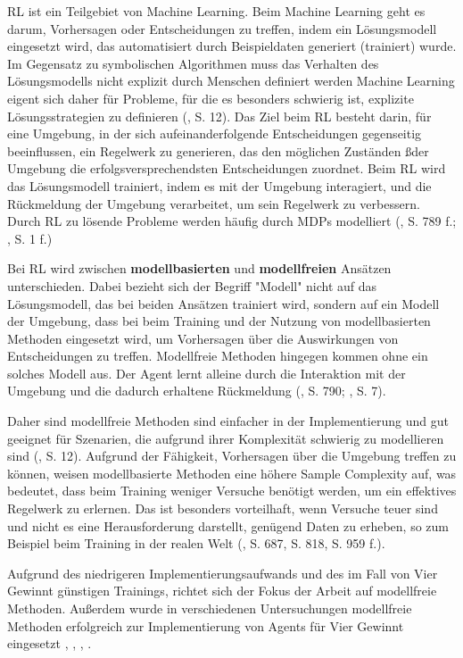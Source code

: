 RL ist ein Teilgebiet von Machine Learning. Beim Machine Learning geht es darum, Vorhersagen oder Entscheidungen zu treffen, indem ein Lösungsmodell eingesetzt wird, das automatisiert durch Beispieldaten generiert (trainiert) wurde. Im Gegensatz zu symbolischen Algorithmen muss das Verhalten des Lösungsmodells nicht explizit durch Menschen definiert werden Machine Learning eigent sich daher für Probleme, für die es besonders schwierig ist, explizite Lösungsstrategien zu definieren (\cite{Humm.2020}, S. 12). Das Ziel beim RL besteht darin, für eine Umgebung, in der sich aufeinanderfolgende Entscheidungen gegenseitig beeinflussen, ein Regelwerk zu generieren, das den möglichen Zuständen ßder Umgebung die erfolgsversprechendsten Entscheidungen zuordnet. Beim RL wird das Lösungsmodell trainiert, indem es mit der Umgebung interagiert, und die Rückmeldung der Umgebung verarbeitet, um sein Regelwerk zu verbessern. Durch RL zu lösende Probleme werden häufig durch MDPs modelliert (\cite{Russell.2020}, S. 789 f.; \cite{Sutton.2018}, S. 1 f.)


Bei RL wird zwischen \textbf{modellbasierten} und \textbf{modellfreien} Ansätzen unterschieden. Dabei bezieht sich der Begriff "Modell" nicht auf das Lösungsmodell, das bei beiden Ansätzen trainiert wird, sondern auf ein Modell der Umgebung, dass bei beim Training und der Nutzung von modellbasierten Methoden eingesetzt wird, um Vorhersagen über die Auswirkungen von Entscheidungen zu treffen. Modellfreie Methoden hingegen kommen ohne ein solches Modell aus. Der Agent lernt alleine durch die Interaktion mit der Umgebung und die dadurch erhaltene Rückmeldung (\cite{Russell.2020}, S. 790; \cite{Sutton.2018}, S. 7).

Daher sind modellfreie Methoden sind einfacher in der Implementierung und gut geeignet für Szenarien, die aufgrund ihrer Komplexität schwierig zu modellieren sind (\cite{Sutton.2018}, S. 12). Aufgrund der Fähigkeit, Vorhersagen über die Umgebung treffen zu können, weisen modellbasierte Methoden eine höhere Sample Complexity auf, was bedeutet, dass beim Training weniger Versuche benötigt werden, um ein effektives Regelwerk zu erlernen. Das ist besonders vorteilhaft, wenn Versuche teuer sind und nicht es eine Herausforderung darstellt, genügend Daten zu erheben, so zum Beispiel beim Training in der realen Welt (\cite{Russell.2020}, S. 687, S. 818, S. 959 f.).

Aufgrund des niedrigeren Implementierungsaufwands und des im Fall von Vier Gewinnt günstigen Trainings, richtet sich der Fokus der Arbeit auf modellfreie Methoden. Außerdem wurde in verschiedenen Untersuchungen modellfreie Methoden erfolgreich zur Implementierung von Agents für Vier Gewinnt eingesetzt \cite{Alderton.2019}, \cite{Taylor.2024}, \cite{Dabas.2022}, \cite{Wäldchen.2022}.

